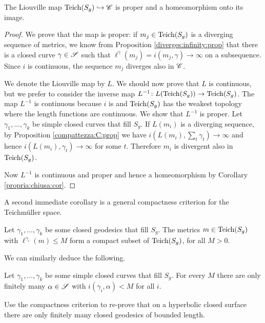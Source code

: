 \begin{cor}
The Liouville map ${\rm Teich}(S_g)\hookrightarrow\mathscr{C}$ is proper and a homeomorphism onto its image.
\end{cor}
\begin{proof}
We prove that the map is proper: if $m_j\in {\rm Teich}(S_g)$ is a diverging sequence of metrics, we know from Proposition \ref{diverges:infinity:prop} that there is a closed curve $\gamma\in\mathscr{S}$ such that $\ell^\gamma(m_j) = i(m_j, \gamma) \to \infty$ on a subsequence. Since $i$ is continuous, the sequence $m_j$ diverges also in $\mathscr{C}$. 

We denote the Liouville map by $L$. We should now prove that $L$ is continuous, but we prefer to consider the inverse map $L^{-1}\colon L({\rm Teich}(S_g)) \to {\rm Teich}(S_g)$. The map $L^{-1}$ is continuous because $i$ is and ${\rm Teich}(S_g)$ has the weakest topology where the length functions are continuous. We show that $L^{-1}$ is proper. Let $\gamma_1, \ldots, \gamma_k$ be simple closed curves that fill $S_g$. If $L(m_i)$ is a diverging sequence, by Proposition \ref{compattezza:C:prop} we have $i(L(m_i),\sum_t \gamma_t)\to \infty$ and hence $i(L(m_i),\gamma_t)\to \infty$ for some $t$. Therefore $m_i$ is divergent also in ${\rm Teich}(S_g)$.

Now $L^{-1}$ is continuous and proper and hence a homeomorphism by
Corollary \ref{propria:chiusa:cor}.
\end{proof}

A second immediate corollary is a general compactness criterion for the Teichm\"uller space.

\begin{cor} \label{bounded:metrics:compact:cor}
Let $\gamma_1,\ldots, \gamma_k$ be some closed geodesics that fill $S_g$. The metrics $m\in{\rm Teich}(S_g)$ with $\ell^{\gamma_i}(m) \leqslant M$ form a compact subset of ${\rm Teich}(S_g)$, for all $M>0$.
\end{cor}

We can similarly deduce the following.
\begin{cor}
Let $\gamma_1,\ldots, \gamma_k$ be some simple closed curves that fill $S_g$. For every $M$ there are only finitely many $\alpha \in \mathscr{S}$ with $i(\gamma_i, \alpha) < M$ for all $i$.
\end{cor}


\begin{ex} Use the compactness criterion to re-prove that on a hyperbolic closed surface there are only finitely many closed geodesics of bounded length.
\end{ex}

